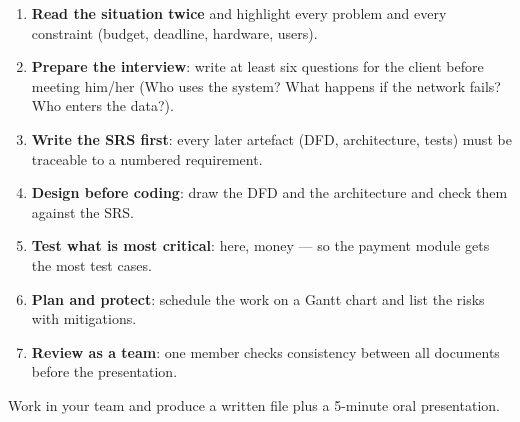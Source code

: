 \documentclass[11pt]{article}
\newcounter{popsec}
\newcounter{popsub}
\newcommand{\courssub}[1]{%
  \stepcounter{popsub}%
  \par\vspace{9pt}\noindent{\popxbold\fontsize{11.5}{13}\selectfont\color{popink}{\color{poporange}\thepopsec.\thepopsub}\hspace{6pt}#1}\par\nopagebreak\vspace{4pt}
}
\begin{document}
\begin{methode}
\begin{enumerate}
\item \textbf{Read the situation twice} and highlight every problem and every constraint (budget, deadline, hardware, users).
\item \textbf{Prepare the interview}: write at least six questions for the client before meeting him/her (Who uses the system? What happens if the network fails? Who enters the data?).
\item \textbf{Write the SRS first}: every later artefact (DFD, architecture, tests) must be traceable to a numbered requirement.
\item \textbf{Design before coding}: draw the DFD and the architecture and check them against the SRS.
\item \textbf{Test what is most critical}: here, money --- so the payment module gets the most test cases.
\item \textbf{Plan and protect}: schedule the work on a Gantt chart and list the risks with mitigations.
\item \textbf{Review as a team}: one member checks consistency between all documents before the presentation.
\end{enumerate}
\end{methode}

\courssub{Tasks}

Work in your team and produce a written file plus a 5-minute oral presentation.
\end{document}

